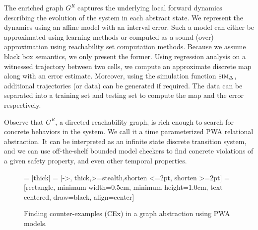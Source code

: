 The enriched graph $G^R$ captures the underlying local forward
dynamics describing the evolution of the system in each abstract
state. We represent the dynamics using an affine model with an
interval error. Such a model can either be approximated using learning
methods or computed as a sound (over) approximation using reachability
set computation methods. Because we assume black box semantics, we
only present the former. Using regression analysis on a witnessed
trajectory between two cells, we compute an approximate discrete map
along with an error estimate.  Moreover, using the simulation function
$\mbox{\sc sim}_\Delta$, additional trajectories (or data) can be generated if
required. The data can be separated into a training set and testing
set to compute the map and the error respectively.


Observe that $G^R$, a directed reachability graph, is rich enough to
search for concrete behaviors in the system. We call it a time
parameterized PWA relational abstraction. It can be interpreted as an
infinite state discrete transition system, and we can use
off-the-shelf bounded model checkers to find concrete violations of a
given safety property, and even other temporal properties.

\begin{figure}[!htbp]
\begin{center}
 = [thick]
 = [->, thick,>=stealth,shorten <=2pt, shorten >=2pt]
 = [rectangle, minimum width=0.5cm, minimum height=1.0cm, text centered, draw=black, align=center]%
\end{center}
\vspace*{-.3cm}
\caption{Finding counter-examples (CEx) in a graph abstraction using PWA models.}
\label{fig:overview}
\vspace*{-.3cm}
\end{figure}
